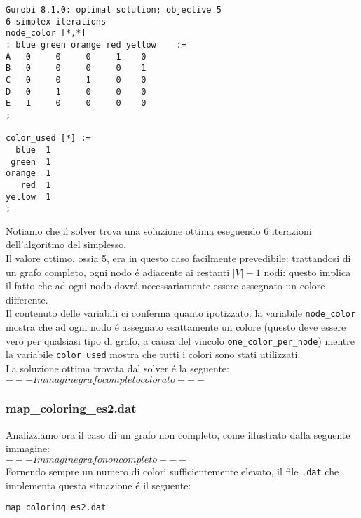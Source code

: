 \documentclass{article}
\begin{document}
\begin{verbatim}
Gurobi 8.1.0: optimal solution; objective 5
6 simplex iterations
node_color [*,*]
: blue green orange red yellow    :=
A   0     0     0     1    0
B   0     0     0     0    1
C   0     0     1     0    0
D   0     1     0     0    0
E   1     0     0     0    0
;

color_used [*] :=
  blue  1
 green  1
orange  1
   red  1
yellow  1
;
\end{verbatim}

Notiamo che il solver trova una soluzione ottima eseguendo 6 iterazioni dell'algoritmo del simplesso.\\
Il valore ottimo, ossia 5, era in questo caso facilmente prevedibile: trattandosi di un grafo completo, ogni nodo \'e adiacente ai restanti $|V| - 1$ nodi: questo implica il fatto che ad ogni nodo dovr\'a necessariamente essere assegnato un colore differente.\\
Il contenuto delle variabili ci conferma quanto ipotizzato: la variabile \texttt{node\_color} mostra che ad ogni nodo \'e assegnato esattamente un colore (questo deve essere vero per qualsiasi tipo di grafo, a causa del vincolo \texttt{one\_color\_per\_node}) mentre la variabile \texttt{color\_used} mostra che tutti i colori sono stati utilizzati.\\

La soluzione ottima trovata dal solver \'e la seguente:\\

$ --- Immagine grafo completo colorato --- $\\





\subsubsection{map\_coloring\_es2.dat}
Analizziamo ora il caso di un grafo non completo, come illustrato dalla seguente immagine:\\

$ --- Immagine grafo non completo --- $\\

Fornendo sempre un numero di colori sufficientemente elevato, il file \texttt{.dat} che implementa questa situazione \'e il seguente:

\vspace{5mm}
\texttt{map\_coloring\_es2.dat}

\vspace{5mm}
\end{document}
